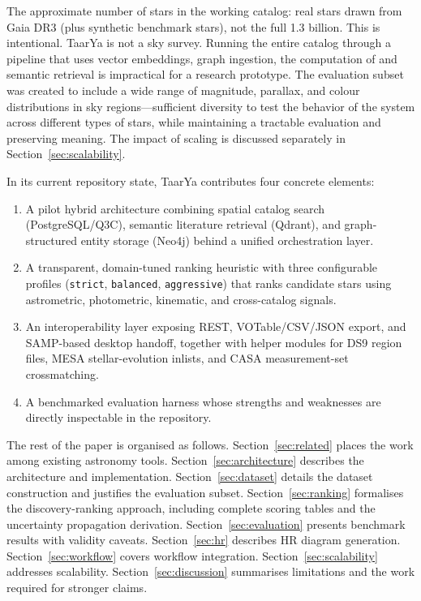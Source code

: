 \documentclass[preprint,12pt,authoryear]{elsarticle}
\begin{document}
The approximate number of stars in the working catalog: \nStarsReal{} real stars drawn from Gaia DR3 (plus \nStarsSynthetic{} synthetic benchmark stars), not the full 1.3 billion. This is intentional. \textsf{TaarYa} is not a sky survey. Running the entire catalog through a pipeline that uses vector embeddings, graph ingestion, the computation of and semantic retrieval is impractical for a research prototype. The evaluation subset was created to include a wide range of magnitude, parallax, and colour distributions in \nClusterNodes{} sky regions---sufficient diversity to test the behavior of the system across different types of stars, while maintaining a tractable evaluation and preserving meaning. The impact of scaling is discussed separately in Section~\ref{sec:scalability}.

In its current repository state, \textsf{TaarYa} contributes four concrete elements:

\begin{enumerate}
    \item A pilot hybrid architecture combining spatial catalog search (PostgreSQL/Q3C), semantic literature retrieval (Qdrant), and graph-structured entity storage (Neo4j) behind a unified orchestration layer.
    \item A transparent, domain-tuned ranking heuristic with three configurable profiles (\texttt{strict}, \texttt{balanced}, \texttt{aggressive}) that ranks candidate stars using astrometric, photometric, kinematic, and cross-catalog signals.
    \item An interoperability layer exposing REST, VOTable/CSV/JSON export, and SAMP-based desktop handoff, together with helper modules for DS9 region files, MESA stellar-evolution inlists, and CASA measurement-set cross\-matching.
    \item A benchmarked evaluation harness whose strengths and weaknesses are directly inspectable in the repository.
\end{enumerate}

The rest of the paper is organised as follows. Section~\ref{sec:related} places the work among existing astronomy tools. Section~\ref{sec:architecture} describes the architecture and implementation. Section~\ref{sec:dataset} details the dataset construction and justifies the evaluation subset. Section~\ref{sec:ranking} formalises the discovery-ranking approach, including complete scoring tables and the uncertainty propagation derivation. Section~\ref{sec:evaluation} presents benchmark results with validity caveats. Section~\ref{sec:hr} describes HR diagram generation. Section~\ref{sec:workflow} covers workflow integration. Section~\ref{sec:scalability} addresses scalability. Section~\ref{sec:discussion} summarises limitations and the work required for stronger claims.
\end{document}
